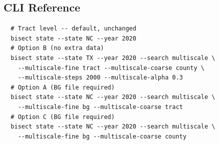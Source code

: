 \subsection{CLI Reference}

\begin{verbatim}
  # Tract level -- default, unchanged
  bisect state --state NC --year 2020
  # Option B (no extra data)
  bisect state --state TX --year 2020 --search multiscale \
    --multiscale-fine tract --multiscale-coarse county \
    --multiscale-steps 2000 --multiscale-alpha 0.3
  # Option A (BG file required)
  bisect state --state NC --year 2020 --search multiscale \
    --multiscale-fine bg --multiscale-coarse tract
  # Option C (BG file required)
  bisect state --state NC --year 2020 --search multiscale \
    --multiscale-fine bg --multiscale-coarse county
\end{verbatim}
